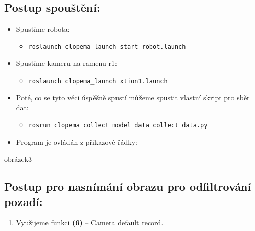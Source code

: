 \documentclass[10pt,a4paper,titlepage,oneside]{book}
\begin{document}
\subsection*{Postup spouštění:}

\begin{itemize}
  \item Spustíme robota: 
  \begin{itemize} 
  
  	\item \verb|roslaunch clopema_launch start_robot.launch|
  \end{itemize}
  
  \item Spustíme kameru na ramenu r1:
  \begin{itemize}
  	\item \verb|roslaunch clopema_launch xtion1.launch|
  \end{itemize}
  
  \item Poté, co se tyto věci úspěšně spustí můžeme spustit vlastní skript pro sběr dat:
  \begin{itemize}
  	\item \verb|rosrun clopema_collect_model_data collect_data.py|
  \end{itemize}
  
  \item Program je ovládán z příkazové řádky:
  
\end{itemize}


obrázek3 \\

\subsection*{Postup pro nasnímání obrazu pro odfiltrování pozadí:}
\begin{enumerate}
  \item Využijeme funkci \textbf{(6)} – Camera default record.
\end{enumerate}
\end{document}
